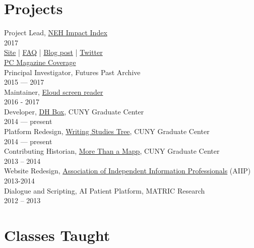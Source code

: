 \documentclass[11pt]{article}
\begin{document}
\section*{Projects}
\label{sec:orgheadline8}
Project Lead, \href{http://www.nehimpact.org/}{NEH Impact Index}\\
2017\\
\href{http://www.nehimpact.org/}{Site} | \href{http://www.nehimpact.org/faq}{FAQ} | \href{https://digitalfellows.commons.gc.cuny.edu/2017/04/10/exploring-the-local-impact-of-the-neh-neh-impact-index/}{Blog post} | \href{https://twitter.com/psmyth01/status/851505002900336644}{Twitter}\\
\href{http://www.pcmag.com/commentary/353904/trump-budget-slashes-neh-funding-why-you-should-care}{PC Magazine Coverage}\\

Principal Investigator, Futures Past Archive\\
2015 — 2017\\

Maintainer, \href{https://github.com/smythp/eloud}{Eloud screen reader}\\
2016 - 2017\\

Developer, \href{http://dhbox.org/}{DH Box}, CUNY Graduate Center\\
2014 — present\\

Platform Redesign, \href{http://www.writingstudiestree.org/}{Writing Studies Tree}, CUNY Graduate Center\\
2014 — present\\

Contributing Historian, \href{http://www.morethanamapp.org/}{More Than a Mapp}, CUNY Graduate Center\\
2013 – 2014\\

Website Redesign, \href{http://www.aiip.org/}{Association of Independent Information Professionals} (AIIP)\\
2013-2014\\

Dialogue and Scripting, AI Patient Platform, MATRIC Research\\
2012 – 2013\\

\section*{Classes Taught}
\label{sec:orgheadline9}
\end{document}
